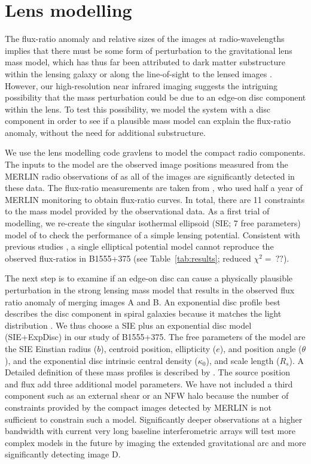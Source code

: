 \documentclass[a4paper,fleqn,usenatbib,useAMS]{mnras}
\begin{document}
\section{Lens modelling}

The flux-ratio anomaly and relative sizes of the images at radio-wavelengths implies that there must be some form of perturbation to the gravitational lens mass model, which has thus far been attributed to dark matter substructure within the lensing galaxy or along the line-of-sight to the lensed images \citep{Dalal2002,Xu14}. However, our high-resolution near infrared imaging suggests the intriguing possibility that the mass perturbation could be due to an edge-on disc component within the lens. To test this possibility, we model the system with a disc component in order to see if a plausible mass model can explain the flux-ratio anomaly, without the need for additional substructure.

We use the lens modelling code {\sc gravlens} \citep{Kee01} to model the compact radio components. The inputs to the model are the observed image positions measured from the MERLIN radio observations of \citet{Marlow99} as all of the images are significantly detected in these data. The flux-ratio measurements are taken from \citet{K03}, who used half a year of MERLIN monitoring to obtain flux-ratio curves. In total, there are 11 constraints to the mass model provided by the observational data. As a first trial of modelling, we re-create the singular isothermal ellipsoid (SIE; 7 free parameters) model of \citet{Marlow99} to check the performance of a simple lensing potential. Consistent with previous studies \citep{Marlow99,Xu14}, a single elliptical potential model cannot reproduce the observed flux-ratios in B1555+375 (see Table~\ref{tab:results}; reduced $\chi^2 =~??$). 

The next step is to examine if an edge-on disc can cause a physically plausible perturbation in the strong lensing mass model that results in the observed flux ratio anomaly of  merging images A and B. An exponential disc profile best describes the disc component in spiral galaxies because it matches the light distribution \citep{Kee98}. We thus choose a SIE plus an exponential disc model (SIE+ExpDisc) in our study of B1555+375. The free parameters of the model are the SIE Einstian radius ($b$), centroid position, ellipticity ($e$), and position angle ($\theta$), and the exponential disc intrinsic central density ($\kappa_0$), and scale length ($R_s$). A Detailed definition of these mass profiles is described by \citet{Kee01}. The source position and flux add three additional model parameters. We have not included a third component such as an external shear or an NFW halo because the number of constraints provided by the compact images detected by MERLIN is not sufficient to constrain such a model. Significantly deeper observations at a higher bandwidth with current very long baseline interferometric arrays will test more complex models in the future by imaging the extended gravitational arc and more significantly detecting image D. 
\end{document}
